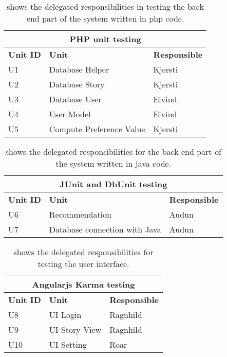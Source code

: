 \begin{table}[H]
	\caption{shows the delegated responsibilities in testing the back end part of the system written in php code.}
	\label{Tab:phptesting}
	\begin{center}
		\begin{tabular}{ | l | l | l |}
			\hline
			\multicolumn{3}{|c|}{\textbf{PHP unit testing}} \\
			\hline
			\textbf{Unit ID} & \textbf{Unit} & \textbf{Responsible} \\ \hline
			U1 & Database Helper & Kjersti \\ \hline
			U2 & Database Story & Kjersti \\ \hline
			U3 & Database User & Eivind \\ \hline
			U4 & User Model & Eivind \\ \hline			
			U5 & Compute Preference Value & Kjersti \\ \hline			
		\end{tabular}
	\end{center}
\end{table}

\begin{table}[H]
		\caption{shows the delegated responsibilities for the back end part of the system written in java code.}
		\label{Tab:junittesting}
	\begin{center}
		\begin{tabular}{ | l | l | l |}
			\hline
			\multicolumn{3}{|c|}{\textbf{JUnit and DbUnit testing}} \\
			\hline
			\textbf{Unit ID} & \textbf{Unit} & \textbf{Responsible} \\ \hline
			U6 & Recommendation  & Audun \\ \hline
			U7 & Database connection with Java & Audun \\\hline			
		\end{tabular}
	\end{center}

\end{table}

\begin{table}[H]
	\caption{shows the delegated responsibilities for testing the user interface.}
	\label{Tab:karmatesting}
	\begin{center}
		\begin{tabular}{ | l | l | l |}
			\hline
			\multicolumn{3}{|c|}{\textbf{Angularjs Karma testing}} \\
			\hline
			\textbf{Unit ID} & \textbf{Unit} & \textbf{Responsible} \\ \hline
			U8 & UI Login & Ragnhild \\ \hline
			U9 & UI Story View & Ragnhild \\ \hline
			U10 & UI Setting & Roar \\ \hline
		\end{tabular}
	\end{center}

\end{table}


